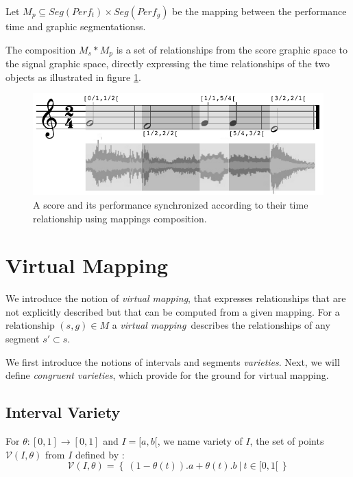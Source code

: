 \documentclass[letterpaper, 12pt]{article}
\newcommand{\seg}[1]			{Seg(#1)}
\newcommand{\compose}			{*}
\newcommand{\variete}			{\ensuremath{\mathcal{V}}}
\newcommand{\VDMapping}		{Virtual Mapping}
\newcommand{\vdmapping}		{virtual mapping}
\newcommand{\VDMapping}		{Continuous Mapping}
\newcommand{\vdmapping}		{continuous mapping}
\begin{document}
Let $M_p\subseteq \seg{Perf_{t}}\times \seg{Perf_{g}}$ be the mapping between the performance time and graphic segmentationss.

The composition $M_s \compose M_p$ is a set of relationships from the score graphic space to the signal graphic space, directly expressing the time relationships of the two objects as illustrated in figure \ref{fig:ex1-sync}.

\begin{figure} %
\begin{center}
	\includegraphics[width=0.9\baseimgwidth]{imgs/sync}
\caption{A score and its performance synchronized according to their time relationship using mappings composition.}
\label{fig:ex1-sync}
\end{center}
\end{figure}


\section{\VDMapping}
\label{sec:vmap}
We introduce the notion of \emph{\vdmapping}, that expresses relationships that are not explicitly described but that can be computed from a given mapping. 
For a relationship $(s,g) \in M$ a \emph{\vdmapping}\ describes the relationships of any segment $s' \subset s$. 

We first introduce the notions of intervals and segments \emph{varieties}. Next, we will define \emph{congruent varieties}, which provide for the ground for \vdmapping .


\subsection{Interval Variety}\label{sub:ivariete}

For  $\theta : [0,1] \rightarrow [0,1]$ and $I = [a, b [$, we name variety of $I$, the set of points $\variete(I,\theta)$ from $I$ defined by :
\begin{equation}
 \variete(I,\theta) = \left\{\ (1 - \theta(t)).a + \theta(t).b \ | \ t \in [0, 1[\ \right\}
\end{equation}
\end{document}
